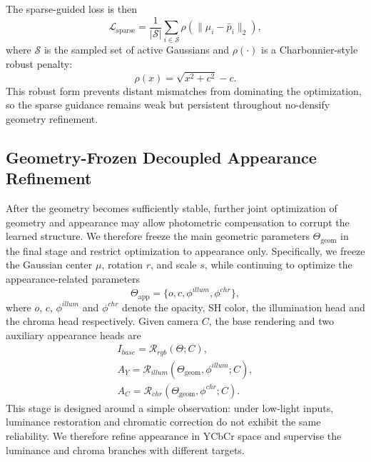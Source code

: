The sparse-guided loss is then
\begin{equation}
\mathcal{L}_{\mathrm{sparse}}
=
\frac{1}{|\mathcal{S}|}
\sum_{i\in\mathcal{S}}
\rho\!\left(\|\mu_i-\bar{p}_i\|_2\right),
\end{equation}
where $\mathcal{S}$ is the sampled set of active Gaussians and $\rho(\cdot)$ is a Charbonnier-style robust penalty:
\begin{equation}
\rho(x)=\sqrt{x^2+c^2}-c.
\end{equation}
This robust form prevents distant mismatches from dominating the optimization, so the sparse guidance remains weak but persistent throughout no-densify geometry refinement.



\subsection{Geometry-Frozen Decoupled Appearance Refinement}
After the geometry becomes sufficiently stable, further joint optimization of
geometry and appearance may allow photometric compensation to corrupt the
learned structure. We therefore freeze the main geometric parameters $\Theta_{\mathrm{geom}}$ in the
final stage and restrict optimization to appearance only. Specifically, we
freeze the Gaussian center $\mu$, rotation $r$, and scale $s$,
while continuing to optimize the appearance-related parameters
\begin{equation}
\Theta_{\mathrm{app}}=\{o,c,\phi^{illum},\phi^{chr}\},
\end{equation}
where $o$, $c$, $\phi^{illum}$ and $\phi^{chr}$ denote the opacity, SH color, the illumination head and the chroma head respectively. Given camera $C$, the base
rendering and two auxiliary appearance heads are
\begin{equation}
\begin{gathered}
I_{base}
=
\mathcal{R}_{rgb}
\!\left(
\Theta;C
\right), \\
A_Y
=
\mathcal{R}_{illum}
\!\left(
\Theta_{\mathrm{geom}},\phi^{illum};C
\right), \\
A_C
=
\mathcal{R}_{chr}
\!\left(
\Theta_{\mathrm{geom}},\phi^{chr};C
\right).
\end{gathered}
\end{equation}
This stage is designed around a simple observation: under low-light inputs,
luminance restoration and chromatic correction do not exhibit the same
reliability. We therefore refine appearance in YCbCr space and supervise the
luminance and chroma branches with different targets.

